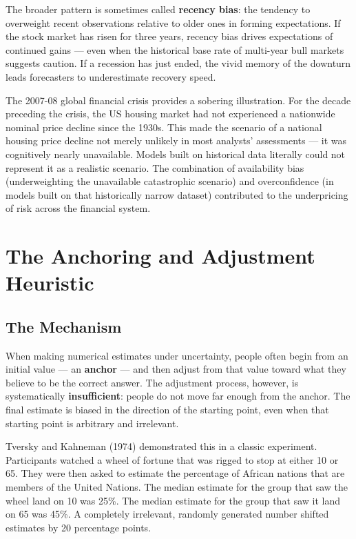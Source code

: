 \documentclass[12pt, letterpaper]{article}
\begin{document}
The broader pattern is sometimes called \textbf{recency bias}: the tendency to overweight recent observations relative to older ones in forming expectations. If the stock market has risen for three years, recency bias drives expectations of continued gains --- even when the historical base rate of multi-year bull markets suggests caution. If a recession has just ended, the vivid memory of the downturn leads forecasters to underestimate recovery speed.

The 2007-08 global financial crisis provides a sobering illustration. For the decade preceding the crisis, the US housing market had not experienced a nationwide nominal price decline since the 1930s. This made the scenario of a national housing price decline not merely unlikely in most analysts' assessments --- it was cognitively nearly unavailable. Models built on historical data literally could not represent it as a realistic scenario. The combination of availability bias (underweighting the unavailable catastrophic scenario) and overconfidence (in models built on that historically narrow dataset) contributed to the underpricing of risk across the financial system.

\medskip


\section{The Anchoring and Adjustment Heuristic}



\subsection{The Mechanism}


When making numerical estimates under uncertainty, people often begin from an initial value --- an \textbf{anchor} --- and then adjust from that value toward what they believe to be the correct answer. The adjustment process, however, is systematically \textbf{insufficient}: people do not move far enough from the anchor. The final estimate is biased in the direction of the starting point, even when that starting point is arbitrary and irrelevant.

Tversky and Kahneman (1974) demonstrated this in a classic experiment. Participants watched a wheel of fortune that was rigged to stop at either 10 or 65. They were then asked to estimate the percentage of African nations that are members of the United Nations. The median estimate for the group that saw the wheel land on 10 was 25\%. The median estimate for the group that saw it land on 65 was 45\%. A completely irrelevant, randomly generated number shifted estimates by 20 percentage points.
\end{document}

